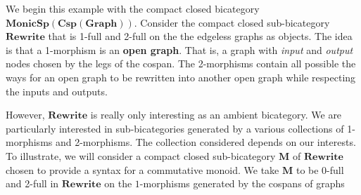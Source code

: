 \documentclass[11pt]{amsart}
\newcommand{\cat}[1]{\mathbf{#1}}
\newcommand{\bimonspcsp}[1]{\mathbf{MonicSp(Csp(#1))}}
\theoremstyle{remark}
\theoremstyle{definition}
\begin{document}
We begin this example with the 
compact closed bicategory 
	$\bimonspcsp{Graph}$.  
Consider the compact closed sub-bicategory 
$\cat{Rewrite}$ that is 
1-full and 2-full on the 
the edgeless graphs as objects.
The idea is that a 1-morphism is 
an \textbf{open graph}. 
That is, a graph with 
\emph{input} and \emph{output} nodes 
chosen by the legs of the cospan. 
The 2-morphisms contain 
all possible the ways for an open graph 
to be rewritten into another open graph
while respecting the inputs and outputs. 

However, $\cat{Rewrite}$ is really only 
interesting as an ambient bicategory.  
We are particularly interested in 
sub-bicategories generated by 
a various collections of 
1-morphisms and 2-morphisms. 
The collection considered
depends on our interests.
To illustrate, we will consider a 
compact closed
sub-bicategory $\cat{M}$ of $\cat{Rewrite}$ 
chosen to provide a syntax for 
a commutative monoid. 
We take $\cat{ M }$ to be 0-full
and 2-full in $\cat{ Rewrite }$ on
the $1$-morphisms generated by
the cospans of graphs
\end{document}
